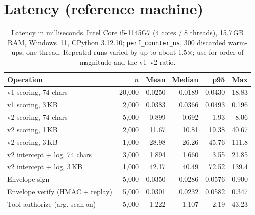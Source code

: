 \documentclass[10pt]{article}
\begin{document}
\section{Latency (reference machine)}
\begin{table}[h]
\centering
\caption{Latency in milliseconds. Intel Core i5-1145G7 (4 cores / 8 threads), 15.7\,GB RAM, Windows~11, CPython
3.12.10; \texttt{perf\_counter\_ns}, 300 discarded warm-ups, one thread. Repeated runs varied by up to about
1.5$\times$; use for order of magnitude and the v1--v2 ratio.}
\footnotesize
\begin{tabular}{@{}lrrrrr@{}}
\toprule
\textbf{Operation} & \textbf{$n$} & \textbf{Mean} & \textbf{Median} & \textbf{p95} & \textbf{Max} \\
\midrule
v1 scoring, 74 chars              & 20{,}000 & 0.0250 & 0.0189 & 0.0430 & 18.83 \\
v1 scoring, 3\,KB                 &  2{,}000 & 0.0383 & 0.0366 & 0.0493 & 0.196 \\
\midrule
v2 scoring, 74 chars              &  5{,}000 & 0.899  & 0.692  & 1.93   & 8.06 \\
v2 scoring, 1\,KB                 &  2{,}000 & 11.67  & 10.81  & 19.38  & 40.67 \\
v2 scoring, 3\,KB                 &  1{,}000 & 28.98  & 26.26  & 45.76  & 111.8 \\
v2 intercept + log, 74 chars      &  3{,}000 & 1.894  & 1.660  & 3.55   & 21.85 \\
v2 intercept + log, 3\,KB         &  1{,}000 & 42.17  & 40.49  & 72.52  & 139.4 \\
\midrule
Envelope sign                     &  5{,}000 & 0.0350 & 0.0286 & 0.0576 & 0.900 \\
Envelope verify (HMAC + replay)   &  5{,}000 & 0.0301 & 0.0232 & 0.0582 & 0.347 \\
Tool authorize (arg. scan on)     &  5{,}000 & 1.222  & 1.107  & 2.19   & 43.23 \\
\bottomrule
\end{tabular}
\end{table}
\end{document}
